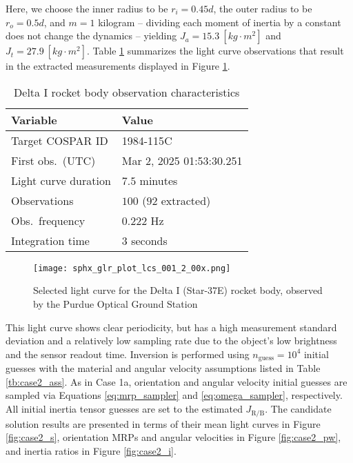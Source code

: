 \documentclass[a4paper,twocolumn]{spaceDebrisC} %
\newcommand{\figbig}[0]{0.5\textwidth}
\begin{document}
Here, we choose the inner radius to be $r_i=0.45d$, the outer radius to be $r_o=0.5d$, and $m=1$ kilogram -- dividing each moment of inertia by a constant does not change the dynamics -- yielding $J_a = 15.3 \: [kg \cdot m^2]$ and $J_t = 27.9 \: [kg \cdot m^2]$. Table \ref{tb:case2_in} summarizes the light curve observations that result in the extracted measurements displayed in Figure \ref{fig:rb_lc_obs}.

\begin{table}[H]
  \centering
  \caption{Delta I rocket body observation characteristics}
  \vspace*{6pt}
  \begin{tabular}{|l|l|}
  \hline
  \textbf{Variable} & \textbf{Value} \\ \hline
 Target COSPAR ID & 1984-115C \\ \hline
 First obs.\ (UTC) & Mar 2, 2025 01:53:30.251 \\ \hline
 Light curve duration & $7.5$ minutes \\ \hline
 Observations & $100$ ($92$ extracted) \\ \hline
 Obs.\ frequency & $0.222$ Hz \\ \hline
 Integration time & $3$ seconds \\ \hline
  \end{tabular}
  \label{tb:case2_in}
\end{table}

\begin{figure}[H]
  \centering
  \texttt{[image: sphx\_glr\_plot\_lcs\_001\_2\_00x.png]}
  \caption{Selected light curve for the Delta I (Star-37E) rocket body, observed by the Purdue Optical Ground Station}
  \label{fig:rb_lc_obs}
\end{figure}

This light curve shows clear periodicity, but has a high measurement standard deviation and a relatively low sampling rate due to the object's low brightness and the sensor readout time. Inversion is performed using $n_\text{guess}=10^4$ initial guesses with the material and angular velocity assumptions listed in Table \ref{tb:case2_ass}. As in Case 1a, orientation and angular velocity initial guesses are sampled via Equations \ref{eq:mrp_sampler} and \ref{eq:omega_sampler}, respectively. All initial inertia tensor guesses are set to the estimated $J_\text{R/B}$. The candidate solution results are presented in terms of their mean light curves in Figure \ref{fig:case2_s}, orientation MRPs and angular velocities in Figure \ref{fig:case2_pw}, and inertia ratios in Figure \ref{fig:case2_i}.
\end{document}
